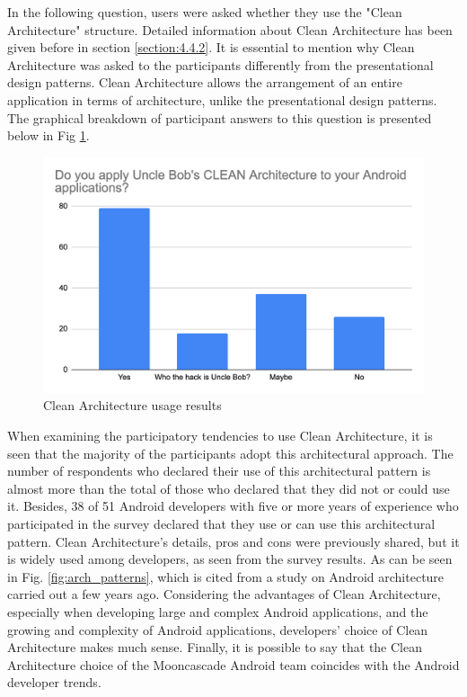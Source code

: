 In the following question, users were asked whether they use the "Clean Architecture" structure. Detailed information about Clean Architecture has been given before in section \ref{section:4.4.2}. It is essential to mention why Clean Architecture was asked to the participants differently from the presentational design patterns. Clean Architecture allows the arrangement of an entire application in terms of architecture, unlike the presentational design patterns. The graphical breakdown of participant answers to this question is presented below in Fig \ref{fig:clean_arch}.
\begin{figure}[ht!]
    \centering
    \includegraphics[scale=0.25]{figures/clean_arch.png}
    \caption{Clean Architecture usage results}
    \label{fig:clean_arch}
\end{figure}
\FloatBarrier

When examining the participatory tendencies to use Clean Architecture, it is seen that the majority of the participants adopt this architectural approach. The number of respondents who declared their use of this architectural pattern is almost more than the total of those who declared that they did not or could use it. Besides, 38 of 51 Android developers with five or more years of experience who participated in the survey declared that they use or can use this architectural pattern. Clean Architecture's details, pros and cons were previously shared, but it is widely used among developers, as seen from the survey results. As can be seen in Fig. \ref{fig:arch_patterns}, which is cited from a study on Android architecture carried out a few years ago. Considering the advantages of Clean Architecture, especially when developing large and complex Android applications, and the growing and complexity of Android applications, developers' choice of Clean Architecture makes much sense. Finally, it is possible to say that the Clean Architecture choice of the Mooncascade Android team coincides with the Android developer trends.